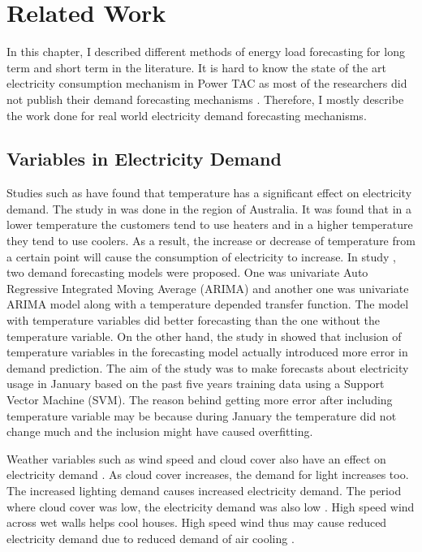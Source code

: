 
\chapter{Related Work}

In this chapter, I described different methods of energy load forecasting for long term and short term in the literature. It is hard to know the state of the art electricity consumption mechanism in Power TAC as most of the researchers did not publish their demand forecasting mechanisms \cite{liefers2014successful, ozdemir2015winner, serranofixing, ozdemir2015agentude}. Therefore, I mostly describe the work done for real world electricity demand forecasting mechanisms.   

\section{Variables in Electricity Demand}

Studies such as \cite{hor2005analyzing, hart2004weather, cho1995customer} have found that temperature has a significant effect on electricity demand. The study in \cite{hart2004weather} was done in the region of Australia.  It was found that in a lower temperature the customers tend to use heaters and in a higher temperature they tend to use coolers. As a result, the increase or decrease of temperature from a certain point will cause the consumption of electricity to increase. In study \cite{cho1995customer}, two demand forecasting models were proposed. One was univariate Auto Regressive Integrated Moving Average (ARIMA) and another one was univariate ARIMA model along with a temperature depended transfer function. The model with temperature variables did better forecasting than the one without the temperature variable. On the other hand, the study in  \cite{chen2004load} showed that inclusion of temperature variables in the forecasting model actually introduced more error in demand prediction. The aim of the study was to make forecasts about electricity usage in January based on the past five years training data using a Support Vector Machine (SVM). The reason behind getting more error after including temperature variable may be because during January the temperature did not change much and the inclusion might have caused overfitting. 

Weather variables such as  wind speed and cloud cover also have an effect on electricity demand \cite{hor2005analyzing, rudenauer2004energy}. As cloud cover increases, the demand for light increases too. The increased lighting demand causes increased electricity demand. The period where cloud cover was low, the electricity demand was also low \cite{hor2005analyzing}. High speed wind across wet walls helps cool houses. High speed wind thus may cause reduced electricity demand due to reduced demand of air cooling \cite{rudenauer2004energy}. 


